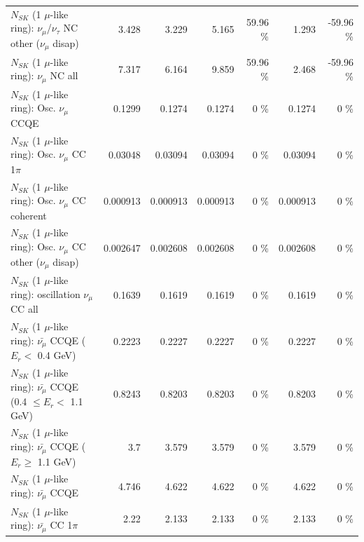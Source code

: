 \begin{table}
\begin{tabular}{| l | r | r | r  r | r  r |}
   $N_{SK}$ (1 $\mu$-like ring): $\nu_\mu$/$\nu_\tau$ NC other ($\nu_\mu$ disap) &           3.428 &           3.229 &           5.165 &    59.96 \%  &           1.293 &   -59.96 \%  \\ 
                                $N_{SK}$ (1 $\mu$-like ring): $\nu_{\mu}$ NC all &           7.317 &           6.164 &           9.859 &    59.96 \%  &           2.468 &   -59.96 \%  \\ 
\hline
\hline
                               $N_{SK}$ (1 $\mu$-like ring): Osc. $\nu_\mu$ CCQE &          0.1299 &          0.1274 &          0.1274 &        0 \%  &          0.1274 &        0 \%  \\ 
                          $N_{SK}$ (1 $\mu$-like ring): Osc. $\nu_\mu$ CC 1$\pi$ &         0.03048 &         0.03094 &         0.03094 &        0 \%  &         0.03094 &        0 \%  \\ 
                        $N_{SK}$ (1 $\mu$-like ring): Osc. $\nu_\mu$ CC coherent &        0.000913 &        0.000913 &        0.000913 &        0 \%  &        0.000913 &        0 \%  \\ 
         $N_{SK}$ (1 $\mu$-like ring): Osc. $\nu_\mu$ CC other ($\nu_\mu$ disap) &        0.002647 &        0.002608 &        0.002608 &        0 \%  &        0.002608 &        0 \%  \\ 
                      $N_{SK}$ (1 $\mu$-like ring): oscillation $\nu_\mu$ CC all &          0.1639 &          0.1619 &          0.1619 &        0 \%  &          0.1619 &        0 \%  \\ 
\hline
\hline
          $N_{SK}$ (1 $\mu$-like ring): $\bar{\nu_\mu}$ CCQE ($E_{r} <$ 0.4 GeV) &          0.2223 &          0.2227 &          0.2227 &        0 \%  &          0.2227 &        0 \%  \\ 
 $N_{SK}$ (1 $\mu$-like ring): $\bar{\nu_\mu}$ CCQE (0.4 $\leq E_{r} <$ 1.1 GeV) &          0.8243 &          0.8203 &          0.8203 &        0 \%  &          0.8203 &        0 \%  \\ 
       $N_{SK}$ (1 $\mu$-like ring): $\bar{\nu_\mu}$ CCQE ($E_{r} \geq$ 1.1 GeV) &             3.7 &           3.579 &           3.579 &        0 \%  &           3.579 &        0 \%  \\ 
\hline
                              $N_{SK}$ (1 $\mu$-like ring): $\bar{\nu_\mu}$ CCQE &           4.746 &           4.622 &           4.622 &        0 \%  &           4.622 &        0 \%  \\ 
                         $N_{SK}$ (1 $\mu$-like ring): $\bar{\nu_\mu}$ CC 1$\pi$ &            2.22 &           2.133 &           2.133 &        0 \%  &           2.133 &        0 \%  \\ 

\end{tabular}
\end{table}
